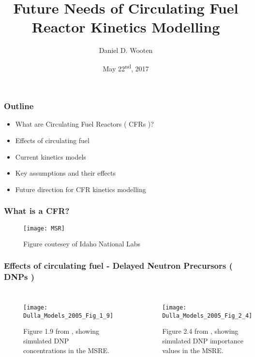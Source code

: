 \documentclass{beamer}
\title[CFR Kinetics Modelling]{Future Needs of Circulating Fuel Reactor Kinetics Modelling}
\author{Daniel D. Wooten}
\institute{UC Berkeley}
\date{May 22\textsuperscript{nd}, 2017}
\begin{document}
\frame{\titlepage}

\begin{frame}

\frametitle{Outline}

    \begin{itemize}
        \item What are Circulating Fuel Reactors ( CFRs )?
        \item Effects of circulating fuel
        \item Current kinetics models
        \item Key assumptions and their effects
        \item Future direction for CFR kinetics modelling
    \end{itemize}

\end{frame}

\begin{frame}
\frametitle{What is a CFR?}

    \begin{figure}
        \centering
        \texttt{[image: MSR]}
        \caption{Figure coutesey of Idaho National Labs}
        \label{fig:msr_pic}
    \end{figure}

\end{frame}

\begin{frame}
\frametitle{Effects of circulating fuel - Delayed Neutron Precursors ( DNPs )}

    \begin{columns}


        \begin{figure}
            \centering
            \texttt{[image: Dulla\_Models\_2005\_Fig\_1\_9]}
            \caption{Figure 1.9 from \cite{dulla_models_2005}, showing 
            simulated DNP concentrations in the MSRE.}
            \label{fig:dulla_models_c}
        \end{figure}

        \column{0.5\paperwidth}

        \begin{figure}
            \centering
            \texttt{[image: Dulla\_Models\_2005\_Fig\_2\_4]}
            \caption{Figure 2.4 from \cite{dulla_models_2005}, showing simulated
            DNP importance values in the MSRE.}
            \label{fig:dulla_models_c_star}
        \end{figure}

    \end{columns}

\end{frame}
\end{document}
